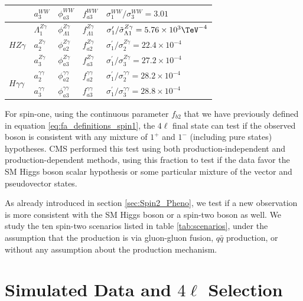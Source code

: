 \begin{table}
\begin{tabular}{lllll}
& $a_3^{WW}$ & $\phi_{a3}^{WW}$ & $f_{a3}^{WW}$ & $\sigma^{WW}_{1}/\sigma^{WW}_{3}=3.01$ \\
\hline
\multirow{3}{*}{$HZ\gamma$} & $\Lambda_{1}^{Z\gamma}$ & $\phi_{\Lambda1}^{Z\gamma}$ & $f_{\Lambda1}^{Z\gamma}$ & $\sigma_{1}^\prime/{\tilde\sigma_{\Lambda1}^{Z\gamma}}=5.76\times 10^{3}\TeV^{-4}$ \\
&$a_2^{Z\gamma}$ & $\phi_{a2}^{Z\gamma}$ & $f_{a2}^{Z\gamma}$ & $\sigma_{1}^\prime/\sigma^{Z\gamma}_{2}=22.4\times10^{-4}$ \\
& $a_3^{Z\gamma}$ & $\phi_{a3}^{Z\gamma}$ & $f_{a3}^{Z\gamma}$ & $\sigma_{1}^\prime/\sigma_{3}^{Z\gamma}=27.2\times10^{-4}$ \\
\hline
\multirow{2}{*}{$H\gamma\gamma$} & $a_2^{\gamma\gamma}$ & $\phi_{a2}^{\gamma\gamma}$ & $f_{a2}^{\gamma\gamma}$  & $\sigma_{1}^\prime/\sigma^{\gamma\gamma}_{2}=28.2\times10^{-4}$ \\
& $a_3^{\gamma\gamma}$ & $\phi_{a3}^{\gamma\gamma}$ & $f_{a3}^{\gamma\gamma}$ & $\sigma_{1}^\prime/\sigma_{3}^{\gamma\gamma}=28.8\times10^{-4}$ \\
\end{tabular}

\end{table}

For spin-one, using the continuous parameter $f_{b2}$ that we have previously defined in equation \eqref{eq:fa_definitions_spin1}, the $4\ell$ final state can test if the observed boson is consistent with any mixture of $1^{+}$ and $1^{-}$ (including pure states) hypotheses. CMS performed this test using both production-independent and production-dependent methods, using this fraction to test if the data favor the SM Higgs boson scalar hypothesis or some particular mixture of the vector and pseudovector states.

As already introduced in section \ref{sec:Spin2_Pheno}, we test if a new observation is more consistent with the SM Higgs boson or a spin-two boson as well. We study the ten spin-two scenarios listed in table \ref{tab:scenarios}, under the assumption that the production is via gluon-gluon fusion, $q\bar{q}$ production, or without any assumption about the production mechanism.

\section{Simulated Data and \texorpdfstring{$4\ell$}{4l} Selection}
\label{sec:Spin_Parity_Simulation}

